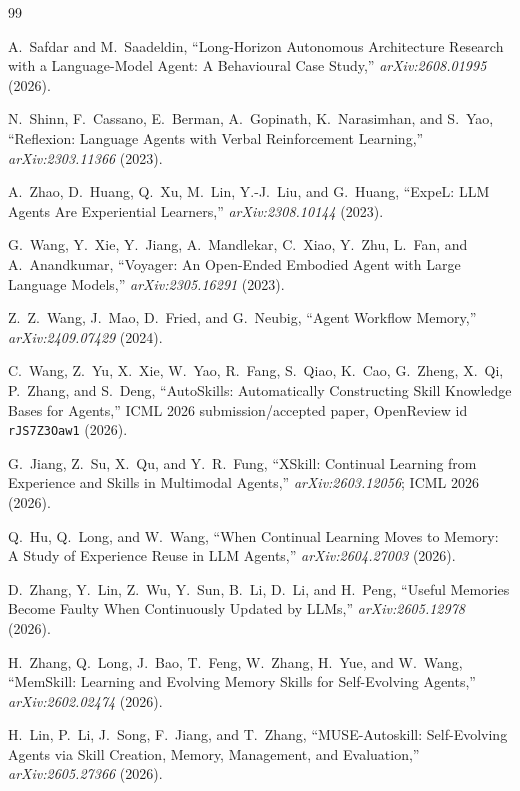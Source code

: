 \begin{thebibliography}{99}

A.~Safdar and M.~Saadeldin,
``Long-Horizon Autonomous Architecture Research with a Language-Model Agent: A Behavioural Case Study,''
\emph{arXiv:2608.01995} (2026).

N.~Shinn, F.~Cassano, E.~Berman, A.~Gopinath, K.~Narasimhan, and S.~Yao,
``Reflexion: Language Agents with Verbal Reinforcement Learning,''
\emph{arXiv:2303.11366} (2023).

A.~Zhao, D.~Huang, Q.~Xu, M.~Lin, Y.-J.~Liu, and G.~Huang,
``ExpeL: LLM Agents Are Experiential Learners,''
\emph{arXiv:2308.10144} (2023).

G.~Wang, Y.~Xie, Y.~Jiang, A.~Mandlekar, C.~Xiao, Y.~Zhu, L.~Fan, and A.~Anandkumar,
``Voyager: An Open-Ended Embodied Agent with Large Language Models,''
\emph{arXiv:2305.16291} (2023).

Z.~Z.~Wang, J.~Mao, D.~Fried, and G.~Neubig,
``Agent Workflow Memory,''
\emph{arXiv:2409.07429} (2024).

C.~Wang, Z.~Yu, X.~Xie, W.~Yao, R.~Fang, S.~Qiao, K.~Cao, G.~Zheng, X.~Qi, P.~Zhang, and S.~Deng,
``AutoSkills: Automatically Constructing Skill Knowledge Bases for Agents,''
ICML 2026 submission/accepted paper, OpenReview id \texttt{rJS7Z3Oaw1} (2026).

G.~Jiang, Z.~Su, X.~Qu, and Y.~R.~Fung,
``XSkill: Continual Learning from Experience and Skills in Multimodal Agents,''
\emph{arXiv:2603.12056}; ICML 2026 (2026).

Q.~Hu, Q.~Long, and W.~Wang,
``When Continual Learning Moves to Memory: A Study of Experience Reuse in LLM Agents,''
\emph{arXiv:2604.27003} (2026).

D.~Zhang, Y.~Lin, Z.~Wu, Y.~Sun, B.~Li, D.~Li, and H.~Peng,
``Useful Memories Become Faulty When Continuously Updated by LLMs,''
\emph{arXiv:2605.12978} (2026).

H.~Zhang, Q.~Long, J.~Bao, T.~Feng, W.~Zhang, H.~Yue, and W.~Wang,
``MemSkill: Learning and Evolving Memory Skills for Self-Evolving Agents,''
\emph{arXiv:2602.02474} (2026).

H.~Lin, P.~Li, J.~Song, F.~Jiang, and T.~Zhang,
``MUSE-Autoskill: Self-Evolving Agents via Skill Creation, Memory, Management, and Evaluation,''
\emph{arXiv:2605.27366} (2026).


\end{thebibliography}

